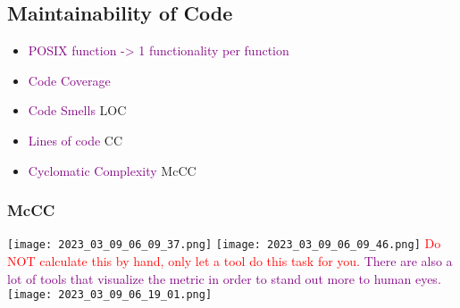 \documentclass[main.tex,fontsize=8pt,paper=a4,paper=portrait,DIV=calc,]{scrartcl}
\begin{document}
\subsection{Maintainability of Code}
\begin{itemize}
\item \textcolor{purple}{POSIX function -> 1 functionality  per function}
\item \textcolor{purple}{Code Coverage}
\item \textcolor{purple}{Code Smells} LOC
\item \textcolor{purple}{Lines of code} CC
\item \textcolor{purple}{Cyclomatic Complexity} McCC
\end{itemize} 

\subsubsection{McCC}
\texttt{[image: 2023\_03\_09\_06\_09\_37.png]}
\texttt{[image: 2023\_03\_09\_06\_09\_46.png]}\newline
\textcolor{red}{Do NOT calculate this by hand, only let a tool do this task for you.}\newline
\textcolor{purple}{There are also a lot of tools that visualize the metric in order to stand out more to human eyes.}\newline
\texttt{[image: 2023\_03\_09\_06\_19\_01.png]}
\end{document}
